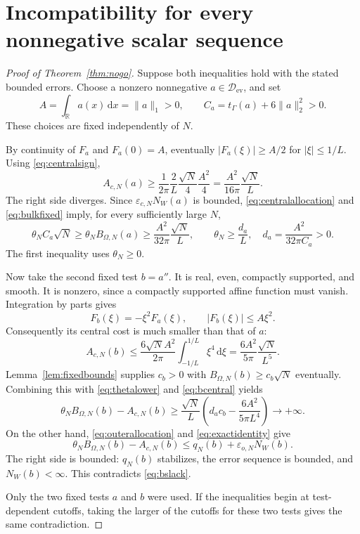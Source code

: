 \documentclass[11pt]{article}
\theoremstyle{remark}
\newcommand{\R}{\mathbb R}
\newcommand{\dd}{\,\mathrm d}
\newcommand{\norm}[1]{\lVert #1\rVert}
\newcommand{\core}{\mathcal D_{\mathrm{ev}}}
\newcommand{\NW}{N_W}
\numberwithin{equation}{section}
\begin{document}
\section{Incompatibility for every nonnegative scalar sequence}\label{sec:nogoproof}
\begin{proof}[Proof of Theorem~\ref{thm:nogo}]
Suppose both inequalities hold with the stated bounded errors. Choose a nonzero nonnegative $a\in\core$, and set
\[
 A=\int_\R a(x)\dd x=\norm{a}_1>0,\qquad
 C_a=t_\Gamma(a)+6\norm{a}_2^2>0.
\]
These choices are fixed independently of $N$.

By continuity of $F_a$ and $F_a(0)=A$, eventually $|F_a(\xi)|\ge A/2$ for $|\xi|\le1/L$. Using \eqref{eq:centralsign},
\begin{equation}\label{eq:acentral}
 A_{c,N}(a)\ge\frac1{2\pi}\frac2L\frac{\sqrt N}{4}\frac{A^2}{4}
       =\frac{A^2}{16\pi}\frac{\sqrt N}{L}.
\end{equation}
The right side diverges. Since $\varepsilon_{c,N}\NW(a)$ is bounded, \eqref{eq:centralallocation} and \eqref{eq:bulkfixed} imply, for every sufficiently large $N$,
\begin{equation}\label{eq:thetalower}
 \theta_N C_a\sqrt N\ge\theta_N B_{\Omega,N}(a)
       \ge\frac{A^2}{32\pi}\frac{\sqrt N}{L},\qquad
 \theta_N\ge\frac{d_a}{L},\quad d_a=\frac{A^2}{32\pi C_a}>0.
\end{equation}
The first inequality uses $\theta_N\ge0$.

Now take the second fixed test $b=a''$. It is real, even, compactly supported, and smooth. It is nonzero, since a compactly supported affine function must vanish. Integration by parts gives
\[
 F_b(\xi)=-\xi^2F_a(\xi),\qquad |F_b(\xi)|\le A\xi^2.
\]
Consequently its central cost is much smaller than that of $a$:
\begin{equation}\label{eq:bcentral}
 A_{c,N}(b)\le\frac{6\sqrt N A^2}{2\pi}
        \int_{-1/L}^{1/L}\xi^4\dd\xi
       =\frac{6A^2}{5\pi}\frac{\sqrt N}{L^5}.
\end{equation}
Lemma~\ref{lem:fixedbounds} supplies $c_b>0$ with
$B_{\Omega,N}(b)\ge c_b\sqrt N$ eventually. Combining this with \eqref{eq:thetalower} and \eqref{eq:bcentral} yields
\begin{equation}\label{eq:bslack}
 \theta_NB_{\Omega,N}(b)-A_{c,N}(b)
 \ge\frac{\sqrt N}{L}
       \left(d_ac_b-\frac{6A^2}{5\pi L^4}\right)
 \longrightarrow+\infty.
\end{equation}
On the other hand, \eqref{eq:outerallocation} and \eqref{eq:exactidentity} give
\begin{equation}\label{eq:contradiction}
 \theta_NB_{\Omega,N}(b)-A_{c,N}(b)
       \le q_N(b)+\varepsilon_{o,N}\NW(b).
\end{equation}
The right side is bounded: $q_N(b)$ stabilizes, the error sequence is bounded, and $\NW(b)<\infty$. This contradicts \eqref{eq:bslack}.

Only the two fixed tests $a$ and $b$ were used. If the inequalities begin at test-dependent cutoffs, taking the larger of the cutoffs for these two tests gives the same contradiction.
\end{proof}
\end{document}
